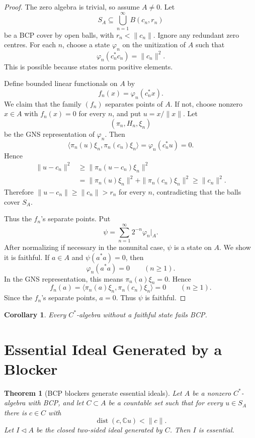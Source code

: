 \documentclass[11pt]{article}
\newtheorem{theorem}{Theorem}
\newtheorem{corollary}{Corollary}
\newcommand{\C}{\mathbb C}
\newcommand{\dist}{\operatorname{dist}}
\begin{document}
\begin{proof}
The zero algebra is trivial, so assume \(A\ne0\).  Let
\[
        S_A\subseteq\bigcup_{n=1}^{\infty}B(c_n,r_n)
\]
be a BCP cover by open balls, with \(r_n<\|c_n\|\).  Ignore any redundant
zero centres.  For each \(n\), choose a state \(\varphi_n\) on the unitization
of \(A\) such that
\[
        \varphi_n(c_n^*c_n)=\|c_n\|^2.
\]
This is possible because states norm positive elements.

Define bounded linear functionals on \(A\) by
\[
        f_n(x)=\varphi_n(c_n^*x).
\]
We claim that the family \((f_n)\) separates points of \(A\).  If not, choose
nonzero \(x\in A\) with \(f_n(x)=0\) for every \(n\), and put
\(u=x/\|x\|\).  Let
\[
        (\pi_n,H_n,\xi_n)
\]
be the GNS representation of \(\varphi_n\).  Then
\[
        \langle \pi_n(u)\xi_n,\pi_n(c_n)\xi_n\rangle
        =
        \varphi_n(c_n^*u)
        =
        0.
\]
Hence
\[
\begin{aligned}
        \|u-c_n\|^2
        &\ge
        \|\pi_n(u-c_n)\xi_n\|^2                                      \\
        &=
        \|\pi_n(u)\xi_n\|^2+\|\pi_n(c_n)\xi_n\|^2
        \ge
        \|c_n\|^2.
\end{aligned}
\]
Therefore \(\|u-c_n\|\ge\|c_n\|>r_n\) for every \(n\), contradicting that the
balls cover \(S_A\).

Thus the \(f_n\)'s separate points.  Put
\[
        \psi=\sum_{n=1}^{\infty}2^{-n}\varphi_n|_A .
\]
After normalizing if necessary in the nonunital case, \(\psi\) is a state on
\(A\).  We show it is faithful.  If \(a\in A\) and \(\psi(a^*a)=0\), then
\[
        \varphi_n(a^*a)=0
        \qquad(n\ge1).
\]
In the GNS representation, this means \(\pi_n(a)\xi_n=0\).  Hence
\[
        f_n(a)=
        \langle \pi_n(a)\xi_n,\pi_n(c_n)\xi_n\rangle
        =
        0
        \qquad(n\ge1).
\]
Since the \(f_n\)'s separate points, \(a=0\).  Thus \(\psi\) is faithful.
\end{proof}

\begin{corollary}
Every \(C^*\)-algebra without a faithful state fails BCP.
\end{corollary}

\section*{Essential Ideal Generated by a Blocker}

\begin{theorem}[BCP blockers generate essential ideals]
\label{thm:essential-generated}
Let \(A\) be a nonzero \(C^*\)-algebra with BCP, and let
\(C\subset A\) be a countable set such that for every \(u\in S_A\) there is
\(c\in C\) with
\[
        \dist(c,\C u)<\|c\|.
\]
Let \(I\triangleleft A\) be the closed two-sided ideal generated by \(C\).
Then \(I\) is essential.
\end{theorem}
\end{document}
